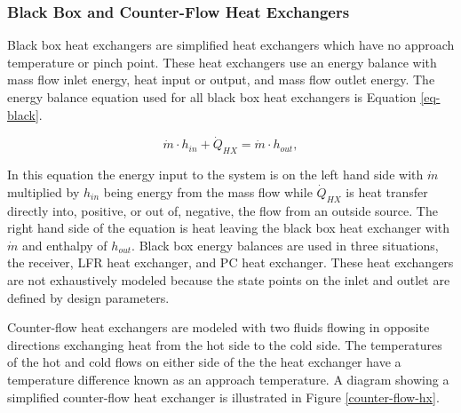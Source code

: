 
\subsubsection{Black Box and Counter-Flow Heat Exchangers}

Black box heat exchangers are simplified heat exchangers which have no approach temperature or pinch point. These heat exchangers use an energy balance with mass flow inlet energy, heat input or output, and mass flow outlet energy. The energy balance equation used for all black box heat exchangers is Equation \ref{eq-black}.



\begin{equation}
    \label{eq-black}
    \dot{m} \cdot h_{in} + \dot{Q}_{HX} = \dot{m} \cdot h_{out} ,
\end{equation}

In this equation the energy input to the system is on the left hand side with $\dot{m}$ multiplied by $h_{in}$ being energy from the mass flow while $\dot{Q}_{HX}$ is heat transfer directly into, positive, or out of, negative, the flow from an outside source. The right hand side of the equation is heat leaving the black box heat exchanger with $\dot{m}$ and enthalpy of $h_{out}$. Black box energy balances are used in three situations, the receiver, LFR heat exchanger, and PC heat exchanger. These heat exchangers are not exhaustively modeled because the state points on the inlet and outlet are defined by design parameters.

Counter-flow heat exchangers are modeled with two fluids flowing in opposite directions exchanging heat from the hot side to the cold side. The temperatures of the hot and cold flows on either side of the the heat exchanger have a temperature difference known as an approach temperature. A diagram showing a simplified counter-flow heat exchanger is illustrated in Figure \ref{counter-flow-hx}.

